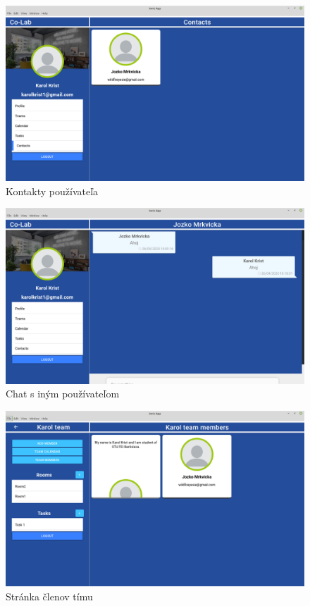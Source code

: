 \begin{figure}[H]
    \centering
    \includegraphics[scale=0.30]{img/design/contacts.png}
    \caption{Kontakty používateľa}
    \label{fig:contacts}
\end{figure}

\begin{figure}[H]
    \centering
    \includegraphics[scale=0.30]{img/design/chat.png}
    \caption{Chat s iným používateľom}
    \label{fig:chat}
\end{figure}

\begin{figure}[H]
    \centering
    \includegraphics[scale=0.30]{img/design/members.png}
    \caption{Stránka členov tímu}
    \label{fig:mem}
\end{figure}

